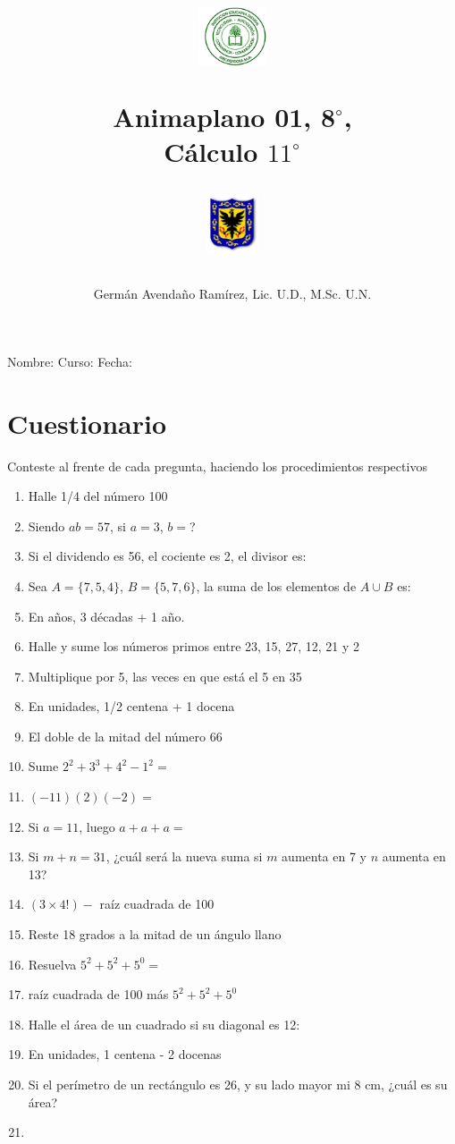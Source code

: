 \documentclass[10pt,twoside]{article}
\author{Germ\'an Avenda\~no Ram\'irez, Lic. U.D., M.Sc. U.N.}
\title{\begin{minipage}{.2\textwidth}
\includegraphics[height=1.75cm]{Images/logo-colegio.png}\end{minipage}
\begin{minipage}{.55\textwidth}
\begin{center}
Animaplano 01, 8$^{\circ}$,  \\
Cálculo $11^{\circ}$
\end{center}
\end{minipage}\hfill
\begin{minipage}{.2\textwidth}
\includegraphics[height=1.75cm]{Images/logo-sed.png} 
\end{minipage}}
\date{}
\begin{document}
\maketitle
Nombre: \hrulefill Curso: \underline{\hspace*{44pt}} Fecha: \underline{\hspace*{2.5cm}}
\section*{Cuestionario}
Conteste al frente de cada pregunta, haciendo los procedimientos respectivos
\begin{enumerate}
 \item Halle 1/4 del número 100
 \item Siendo $ab=57$, si $a=3$, $b=$?
 \item Si el dividendo es 56, el cociente es 2, el divisor es:
 \item Sea $A=\{7,5,4\}$, $B=\{5,7,6\}$, la suma de los elementos de $A\cup B$ es:
 \item En años, 3 décadas + 1 año.
 \item Halle y sume los números primos entre 23, 15, 27, 12, 21 y 2
 \item Multiplique por 5, las veces en que está el 5 en 35
 \item En unidades, 1/2 centena + 1 docena
 \item El doble de la mitad del número 66
 \item Sume $2^{2}+3^{3}+4^{2}-1^{2}=$
 \item $(-11)(2)(-2)=$
 \item Si $a=11$, luego $a+a+a=$
 \item Si $m+n=31$, ¿cuál será la nueva suma si $m$ aumenta en 7 y $n$ aumenta en 13?
 \item $(3\times4!)-$ raíz cuadrada de 100
 \item Reste 18 grados a la mitad de un ángulo llano
 \item Resuelva $5^{2}+5^{2}+5^{0}=$
 \item raíz cuadrada de 100 más $5^{2}+5^{2}+5^{0}$
 \item Halle el área de un cuadrado si su diagonal es 12:
 \item En unidades, 1 centena - 2 docenas
 \item Si el perímetro de un rectángulo es 26, y su lado mayor mi 8 cm, ¿cuál es su área?
 \item 
\end{enumerate}
\end{document}
